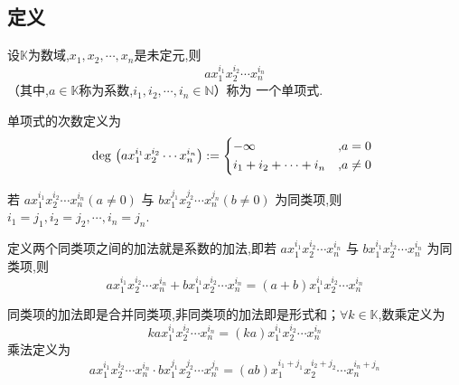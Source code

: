 \subsection{定义}
\begin{formal}
\begin{definition}[单项式]\label{def:单项式}
    设$\mathbb{K}$为数域,$x_1,x_2,\cdots,x_n$是未定元,则
    \[
    ax_1^{i_1}x_2^{i_2}\cdots x_n^{i_n}
    \]
    （其中,$a\in\mathbb{K}$称为系数,$i_1,i_2,\cdots,i_n\in\mathbb{N}$）称为
    一个单项式.

    单项式的次数定义为
    \[
    \deg\,\left(ax_1^{i_1}x_2^{i_2}\cdots x_n^{i_n} \right):=
    \begin{cases*}
    -\infty &,$a=0$\\
    i_1+i_2+\cdots+i_n&,$a\neq 0$
    \end{cases*}
    \]
\end{definition}
\end{formal}
\begin{formal}
\begin{definition}[同类项]\label{def:同类项}
    若 $ax_1^{i_1}x_2^{i_2}\cdots x_n^{i_n}\left(a\neq 0\right)$ 与 $bx_1^{j_1}x_2^{j_2}\cdots x_n^{j_n}\left(b\neq 0\right)$ 为同类项,则 $i_1=j_1,i_2=j_2,\cdots,i_n=j_n$.
\end{definition}
\end{formal}
\begin{formal}
\begin{definition}[合并同类项]\label{def:合并同类项}
    定义两个同类项之间的加法就是系数的加法,即若 $ax_1^{i_1}x_2^{i_2}\cdots x_n^{i_n}$ 与 $bx_1^{i_1}x_2^{i_2}\cdots x_n^{i_n}$ 为同类项,则
    \[ ax_1^{i_1}x_2^{i_2}\cdots x_n^{i_n}+bx_1^{i_1}x_2^{i_2}\cdots x_n^{i_n}=\left(a+b\right)x_1^{i_1}x_2^{i_2}\cdots x_n^{i_n} \]
\end{definition}
\end{formal}
\begin{formal}
\begin{definition}[单项式的运算定义]\label{def:单项式的运算定义}
    同类项的加法即是合并同类项,非同类项的加法即是形式和；$\forall k \in\mathbb{K}$,数乘定义为
    \[ kax_1^{i_1}x_2^{i_2}\cdots x_n^{i_n}=\left(ka\right)x_1^{i_1}x_2^{i_2}\cdots x_n^{i_n} \]
    乘法定义为
    \[ ax_1^{i_1}x_2^{i_2}\cdots x_n^{i_n}\cdot bx_1^{j_1}x_2^{j_2}\cdots x_n^{j_n}=\left(ab\right)x_1^{i_1+j_1}x_2^{i_2+j_2}\cdots x_n^{i_n+j_n} \]
\end{definition}
\end{formal}

